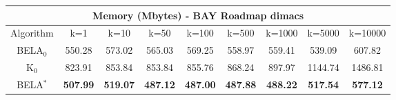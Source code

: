 \begin{tabular}{c|cccccccc}\toprule
\multicolumn{9}{c}{Memory (Mbytes) - BAY Roadmap dimacs}\\ \midrule
Algorithm & k=1 & k=10 & k=50 & k=100 & k=500 & k=1000 & k=5000 & k=10000 \\ \midrule
BELA$_0$ & 550.28 & 573.02 & 565.03 & 569.25 & 558.97 & 559.41 & 539.09 & 607.82 \\
K$_0$ & 823.91 & 853.84 & 853.84 & 855.76 & 868.24 & 897.97 & 1144.74 & 1486.81 \\
BELA$^*$ & \textbf{507.99} & \textbf{519.07} & \textbf{487.12} & \textbf{487.00} & \textbf{487.88} & \textbf{488.22} & \textbf{517.54} & \textbf{577.12} \\ \bottomrule 
\end{tabular}
